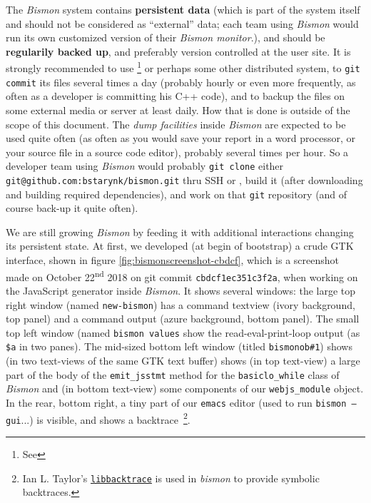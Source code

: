 The \textit{Bismon} system contains \textbf{persistent data} (which is
part of the system itself and should not be considered as ``external''
data; each team using \textit{Bismon} would run its own customized
version of their \textit{Bismon monitor}.), and should be
\textbf{regularily backed up}, and preferably version controlled at
the user site. It is strongly recommended to use
 \footnote{See }
or perhaps some other distributed  system, to \texttt{git commit} its files several times a
day (probably hourly or even more frequently, as often as a developer
is committing his C++ code), and to backup the files on some external
media or server at least daily. How that is done is outside of the
scope of this document. The \emph{dump facilities} inside
\textit{Bismon} are expected to be used quite often (as often as you
would save your report in a word processor, or your source file in a
source code editor), probably several times per hour. So a developer
team using \textit{Bismon} would probably \texttt{git clone} either
\texttt{git@github.com:bstarynk/bismon.git} thru SSH or
, build it (after
downloading and building required dependencies), and work on that
\texttt{git} repository (and of course back-up it quite often).

We are still growing \emph{Bismon} by feeding it with additional
interactions changing its persistent state. At first, we developed (at
begin of bootstrap) a crude GTK interface,
shown in figure \ref{fig:bismonscreenshot-cbdcf}, which is a
screenshot made on October 22\textsuperscript{nd} 2018 on git commit
\texttt{cbdcf1ec351c3f2a}, when working on the JavaScript generator
inside \emph{Bismon}. It shows several windows: the large top right
window (named \texttt{new-bismon}) has a command textview (ivory
background, top panel) and a command output (azure background, bottom
panel). The small top left window (named \texttt{bismon values} show
the read-eval-print-loop output (as \texttt{\$a} in two panes). The
mid-sized bottom left window (titled \texttt{bismonob\#1}) shows (in
two text-views of the same GTK text buffer) shows (in top text-view) a
large part of the body of the \texttt{emit\_jsstmt} method for the
\texttt{basiclo\_while} class of \emph{Bismon} and (in bottom
text-view) some components of our \texttt{webjs\_module} object. In
the rear, bottom right, a tiny part of our \texttt{emacs} editor (used
to run \texttt{bismon --gui}...) is visible, and shows a
backtrace~\footnote{Ian L. Taylor's
  \href{https://github.com/ianlancetaylor/libbacktrace}{\texttt{libbacktrace}}
  is used in \emph{bismon} to provide symbolic backtraces.}.


